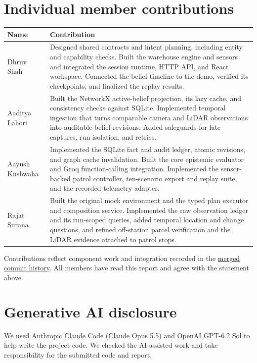 \documentclass[11pt,a4paper,twocolumn]{article}
\begin{document}
\section*{Individual member contributions}
{\small
\begin{tabularx}{\linewidth}{@{}l X@{}}
\toprule
Name & Contribution \\
\midrule
Dhruv Shah & Designed shared contracts and intent planning, including
entity and capability checks. Built the warehouse engine and sensors
and integrated the session runtime, HTTP API, and React workspace.
Connected the belief timeline to the demo, verified its checkpoints,
and finalized the replay results. \\
Aaditya Lahori & Built the NetworkX active-belief projection, its lazy
cache, and consistency checks against SQLite. Implemented temporal
ingestion that turns comparable camera and LiDAR observations into
auditable belief revisions. Added safeguards for late captures,
run isolation, and retries. \\
Aayush Kushwaha & Implemented the SQLite fact and audit ledger,
atomic revisions, and graph cache invalidation. Built the core
epistemic evaluator and Groq function-calling integration. Implemented
the sensor-backed patrol controller, ten-scenario export and replay
suite, and the recorded telemetry adapter. \\
Rajat Surana & Built the original mock environment and the typed
plan executor and composition service. Implemented the raw
observation ledger and its run-scoped queries, added temporal location
and change questions, and refined off-station parcel verification and
the LiDAR evidence attached to patrol stops. \\
\bottomrule
\end{tabularx}}

\smallskip
\noindent Contributions reflect component work and integration recorded in
the \href{https://github.com/dhruvkshah75/groundtruth/commits/50127947154341efce02b63e7e859074764ea1fe/}{merged commit history}.
All members have read this report and agree with the statement above.

\section*{Generative AI disclosure}
We used Anthropic Claude Code (Claude Opus 5.5) and OpenAI GPT-6.2 Sol
to help write the project code. We checked the AI-assisted work and
take responsibility for the submitted code and report.
\end{document}
